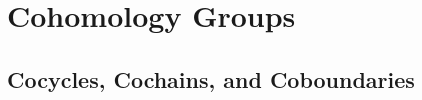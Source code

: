 \documentclass[../Moduli_Spaces_of_Riemann_Surfaces.tex]{subfiles}
\begin{document}
    \section{Cohomology Groups}
    \subsection{Cocycles, Cochains, and Coboundaries}
    \begin{definition}
        
    \end{definition}
\end{document}
